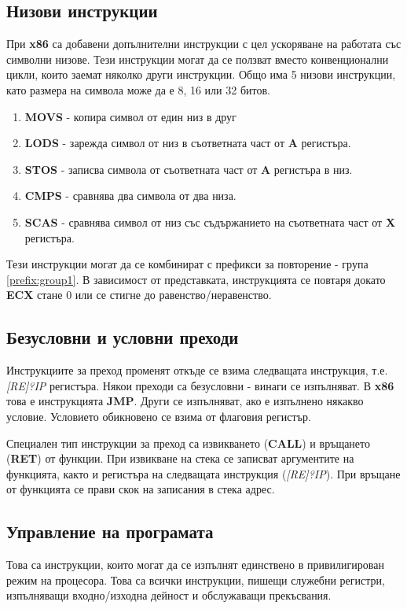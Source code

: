 \documentclass[fleqn,12pt]{article}
\begin{document}
\subsection{Низови инструкции}
При \textbf{x86} са добавени допълнителни инструкции с цел ускоряване на работата със символни низове.
Тези инструкции могат да се ползват вместо конвенционални цикли, които заемат няколко други инструкции.
Общо има 5 низови инструкции, като размера на символа може да е 8, 16 или 32 битов.
\begin{enumerate}
    \item \textbf{MOVS} - копира символ от един низ в друг
    \item \textbf{LODS} - зарежда символ от низ в съответната част от \textbf{A} регистъра.
    \item \textbf{STOS} - записва символа от съответната част от \textbf{A} регистъра в низ.
    \item \textbf{CMPS} - сравнява два символа от два низа.
    \item \textbf{SCAS} - сравнява символ от низ със съдържанието на съответната част от \textbf{X} регистъра.
\end{enumerate}

Тези инструкции могат да се комбинират с префикси за повторение - група \ref{prefix:group1}. 
В зависимост от представката, инструкцията се повтаря докато \textbf{ECX} стане 0 или се стигне
до равенство/неравенство.

\subsection{Безусловни и условни преходи}
Инструкциите за преход променят откъде се взима следващата инструкция, т.е. \textit{[RE]?IP} регистъра.
Някои преходи са безусловни - винаги се изпълняват. В \textbf{x86} това е инструкцията \textbf{JMP}.
Други се изпълняват, ако е изпълнено някакво условие. Условието обикновено се взима от флаговия регистър.

Специален тип инструкции за преход са извикването (\textbf{CALL}) и връщането (\textbf{RET}) от функции.
При извикване на стека се записват аргументите на функцията, както и регистъра на следващата инструкция (\textit{[RE]?IP}).
При връщане от функцията се прави скок на записания в стека адрес.

\subsection{Управление на програмата}
Това са инструкции, които могат да се изпълнят единствено в привилигирован режим на процесора.
Това са всички инструкции, пишещи служебни регистри, изпълняващи входно/изходна дейност и 
обслужаващи прекъсвания.
\end{document}
